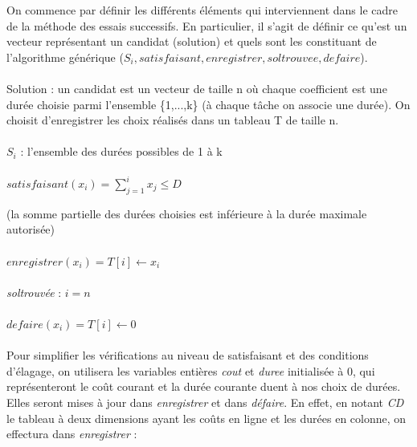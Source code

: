 \documentclass[a4paper, titlepage]{article}
\begin{document}
		On commence par définir les différents éléments qui interviennent dans le cadre de la méthode des essais successifs.
		En particulier, il s'agit de définir ce qu'est un vecteur représentant un candidat (solution) et quels sont les constituant de l'algorithme générique ($S_{i}, satisfaisant, enregistrer, soltrouvee, defaire$).

		\paragraph{}\noindent
		Solution : un candidat est un vecteur de taille n où chaque coefficient est une durée choisie parmi l'ensemble \{1,...,k\} (à chaque tâche on associe une durée).
		On choisit d'enregistrer les choix réalisés dans un tableau T de taille n.

		\paragraph{}\noindent
		$S_{i}$ : l'ensemble des durées possibles de 1 à k

		\paragraph{}\noindent
		$satisfaisant(x_{i}) = \sum_{j=1}^{i} x_{j} \le D$

		(la somme partielle des durées choisies est inférieure à la durée maximale autorisée)

		\paragraph{}\noindent
		$enregistrer(x_{i}) = T[i] \leftarrow x_{i}$

		\paragraph{}\noindent
		\emph{soltrouvée} : $i = n$

		\paragraph{}\noindent
		$defaire(x_{i}) = T[i] \leftarrow 0$

		\paragraph{}
		Pour simplifier les vérifications au niveau de satisfaisant et des conditions d'élagage, on utilisera les variables entières \emph{cout} et \emph{duree} initialisée à 0,
		qui représenteront le coût courant et la durée courante duent à nos choix de durées.
		Elles seront mises à jour dans \emph{enregistrer} et dans \emph{défaire}.
		En effet, en notant \emph{CD} le tableau à deux dimensions ayant les coûts en ligne et les durées en colonne, on effectura dans \emph{enregistrer} :
\end{document}
